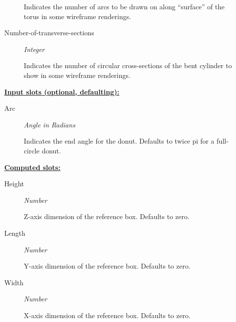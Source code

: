 \documentclass [11pt]{book}
\begin{document}
\begin{itemize}
\begin{description}
 Indicates the number of arcs to be drawn on along ``surface'' of the torus in some wireframe renderings.




\item [Number-of-transverse-sections]
\emph{Integer}

 Indicates the number of circular cross-sections of the bent cylinder to show in some wireframe renderings.




\end{description}






\textbf{
\underline{Input slots (optional, defaulting):}}

\begin{description}

\item [Arc]
\emph{Angle in Radians}

 Indicates the end angle for the donut. Defaults to twice pi for a full-circle donut.




\end{description}






\textbf{
\underline{Computed slots:}}

\begin{description}

\item [Height]
\emph{Number}

 Z-axis dimension of the reference box. Defaults to zero.




\item [Length]
\emph{Number}

 Y-axis dimension of the reference box. Defaults to zero.




\item [Width]
\emph{Number}

 X-axis dimension of the reference box. Defaults to zero.




\end{description}








\end{itemize}
\end{document}
